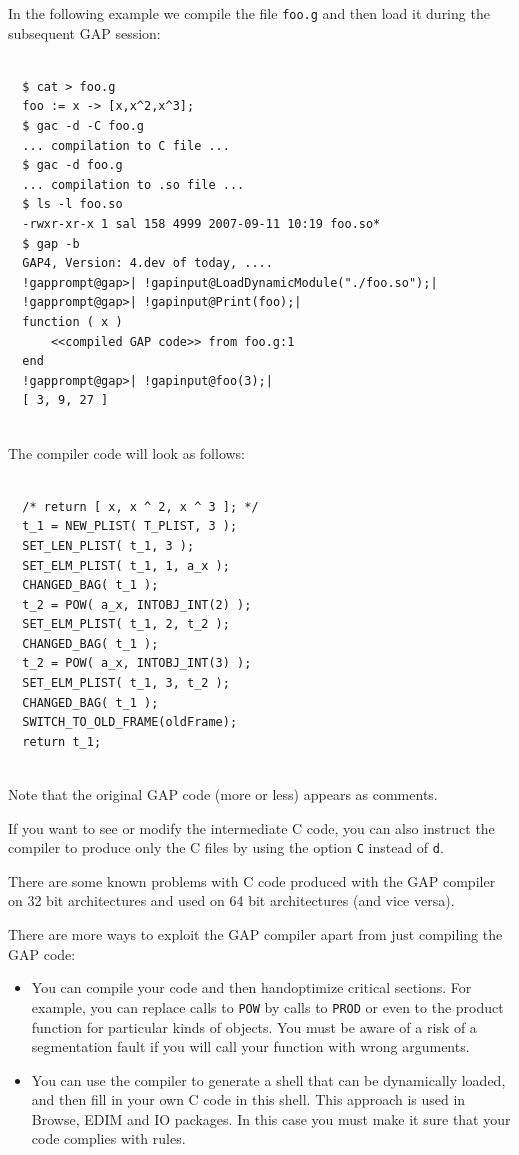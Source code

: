 \documentclass[a4paper,11pt]{report}
\begin{document}
{{{ In the following example we compile the file \texttt{foo.g} and then load it during the subsequent \textsf{GAP} session: 
\begin{Verbatim}[commandchars=!@|,fontsize=\small,frame=single,label=Example]
  
  $ cat > foo.g
  foo := x -> [x,x^2,x^3];
  $ gac -d -C foo.g
  ... compilation to C file ...
  $ gac -d foo.g
  ... compilation to .so file ...
  $ ls -l foo.so
  -rwxr-xr-x 1 sal 158 4999 2007-09-11 10:19 foo.so*
  $ gap -b
  GAP4, Version: 4.dev of today, ....
  !gapprompt@gap>| !gapinput@LoadDynamicModule("./foo.so");|
  !gapprompt@gap>| !gapinput@Print(foo);|
  function ( x )
      <<compiled GAP code>> from foo.g:1
  end
  !gapprompt@gap>| !gapinput@foo(3);|
  [ 3, 9, 27 ]
  
\end{Verbatim}
 The compiler code will look as follows: 
\begin{Verbatim}[commandchars=!@|,fontsize=\small,frame=single,label=Example]
  
  /* return [ x, x ^ 2, x ^ 3 ]; */
  t_1 = NEW_PLIST( T_PLIST, 3 );
  SET_LEN_PLIST( t_1, 3 );
  SET_ELM_PLIST( t_1, 1, a_x );
  CHANGED_BAG( t_1 );
  t_2 = POW( a_x, INTOBJ_INT(2) );
  SET_ELM_PLIST( t_1, 2, t_2 );
  CHANGED_BAG( t_1 );
  t_2 = POW( a_x, INTOBJ_INT(3) );
  SET_ELM_PLIST( t_1, 3, t_2 );
  CHANGED_BAG( t_1 );
  SWITCH_TO_OLD_FRAME(oldFrame);
  return t_1;
  
\end{Verbatim}
 Note that the original \textsf{GAP} code (more or less) appears as comments. 

 If you want to see or modify the intermediate \textsf{C} code, you can also instruct the compiler to produce only the \textsf{C} files by using the option \texttt{\texttt{}C} instead of \texttt{\texttt{}d}. 

 There are some known problems with \textsf{C} code produced with the \textsf{GAP} compiler on 32 bit architectures and used on 64 bit architectures (and vice
versa). 

 There are more ways to exploit the \textsf{GAP} compiler apart from just compiling the \textsf{GAP} code: 
\begin{itemize}
\item You can compile your code and then hand\texttt{}optimize critical
sections. For example, you can replace calls to \texttt{POW} by calls to \texttt{PROD} or even to the product function for particular kinds of objects. You must be
aware of a risk of a segmentation fault if you will call your function with
wrong arguments. 
\item  You can use the compiler to generate a shell that can be dynamically loaded,
and then fill in your own \textsf{C} code in this shell. This approach is used in \textsf{Browse}, \textsf{EDIM} and \textsf{IO} packages. In this case you must make it sure that your code complies with
rules. 
\end{itemize}
 }

}}
\end{document}
